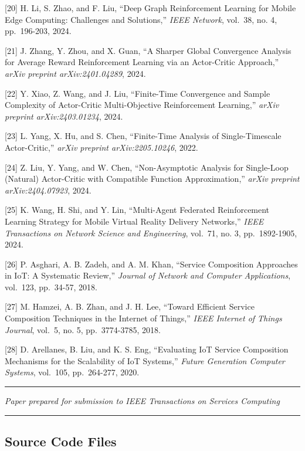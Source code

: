\documentclass[
  10pt,
  twocolumn,
]{article}
\begin{document}
{[}20{]} H. Li, S. Zhao, and F. Liu, ``Deep Graph Reinforcement Learning
for Mobile Edge Computing: Challenges and Solutions,'' \emph{IEEE
	Network}, vol.~38, no. 4, pp.~196-203, 2024.

{[}21{]} J. Zhang, Y. Zhou, and X. Guan, ``A Sharper Global Convergence
Analysis for Average Reward Reinforcement Learning via an Actor-Critic
Approach,'' \emph{arXiv preprint arXiv:2401.04289}, 2024.

{[}22{]} Y. Xiao, Z. Wang, and J. Liu, ``Finite-Time Convergence and
Sample Complexity of Actor-Critic Multi-Objective Reinforcement
Learning,'' \emph{arXiv preprint arXiv:2403.01234}, 2024.

{[}23{]} L. Yang, X. Hu, and S. Chen, ``Finite-Time Analysis of
Single-Timescale Actor-Critic,'' \emph{arXiv preprint arXiv:2205.10246},
2022.

{[}24{]} Z. Liu, Y. Yang, and W. Chen, ``Non-Asymptotic Analysis for
Single-Loop (Natural) Actor-Critic with Compatible Function
Approximation,'' \emph{arXiv preprint arXiv:2404.07923}, 2024.

{[}25{]} K. Wang, H. Shi, and Y. Lin, ``Multi-Agent Federated
Reinforcement Learning Strategy for Mobile Virtual Reality Delivery
Networks,'' \emph{IEEE Transactions on Network Science and Engineering},
vol.~71, no. 3, pp.~1892-1905, 2024.

{[}26{]} P. Asghari, A. B. Zadeh, and A. M. Khan, ``Service Composition
Approaches in IoT: A Systematic Review,'' \emph{Journal of Network and
	Computer Applications}, vol.~123, pp.~34-57, 2018.

{[}27{]} M. Hamzei, A. B. Zhan, and J. H. Lee, ``Toward Efficient
Service Composition Techniques in the Internet of Things,'' \emph{IEEE
	Internet of Things Journal}, vol.~5, no. 5, pp.~3774-3785, 2018.

{[}28{]} D. Arellanes, B. Liu, and K. S. Eng, ``Evaluating IoT Service
Composition Mechanisms for the Scalability of IoT Systems,''
\emph{Future Generation Computer Systems}, vol.~105, pp.~264-277, 2020.

\begin{center}\rule{0.5\linewidth}{0.5pt}\end{center}

\emph{Paper prepared for submission to IEEE Transactions on Services
	Computing}

\begin{center}\rule{0.5\linewidth}{0.5pt}\end{center}

\hypertarget{source-code-files}{%
	\subsection{Source Code Files}\label{source-code-files}}
\end{document}
